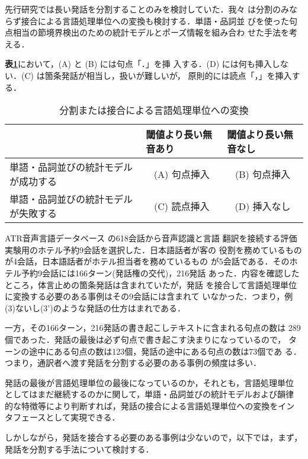先行研究\cite{Lavie96}では長い発話を分割することのみを検討していた．我々
は分割のみならず接合による言語処理単位への変換も検討する．単語・品詞並
びを使った句点相当の節境界検出のための統計モデルとポーズ情報を組み合わ
せた手法を考える．

{\bf\dg 表\ref{t:combination}}において，(A) と (B) には句点「．」を挿
入する．(D) には何も挿入しない．(C) は箇条発話が相当し，扱いが難しいが，
原則的には読点「，」を挿入する．

\begin{table}
\caption{分割または接合による言語処理単位への変換}\label{t:combination}
\begin{center}
\begin{tabular}{|l||c|c|}
\hline
 & \multicolumn{1}{l|}{閾値より長い無音あり}
 & \multicolumn{1}{l|}{閾値より長い無音なし} \\
\hline\hline
単語・品詞並びの統計モデルが成功する & (A) 句点挿入 & (B) 句点挿入 \\
\hline
単語・品詞並びの統計モデルが失敗する & (C) 読点挿入 & (D) 挿入なし \\
\hline
\end{tabular}
\end{center}
\end{table}

ATR音声言語データベース \cite{Morimoto94} の618会話から音声認識と言語
翻訳を接続する評価実験用のホテル予約9会話を選択した．日本語話者が客の
役割を務めているものが4会話，日本語話者がホテル担当者を務めているもの
が5会話である．そのホテル予約9会話には166ターン(発話権の交代)，216発話
あった．内容を確認したところ，体言止めの箇条発話は含まれていたが，発話
を接合して言語処理単位に変換する必要のある事例はその9会話には含まれて
いなかった．つまり，例(3)ないし(3')のような発話の仕方はまれである．

一方，その166ターン，216発話の書き起こしテキストに含まれる句点の数は
289個であった．発話の最後は必ず句点で書き起こす決まりになっているので，
ターンの途中にある句点の数は123個，発話の途中にある句点の数は73個であ
る．つまり，通訳者へ渡す発話を分割する必要のある事例の頻度は多い．

発話の最後が言語処理単位の最後になっているのか，それとも，言語処理単位
としてはまだ継続するのかに関して，単語・品詞並びの統計モデルおよび韻律
的な特徴等により判断すれば，発話の接合による言語処理単位への変換をイン
タフェースとして実現できる．

しかしながら，発話を接合する必要のある事例は少ないので，以下では，まず，
発話を分割する手法について検討する．


